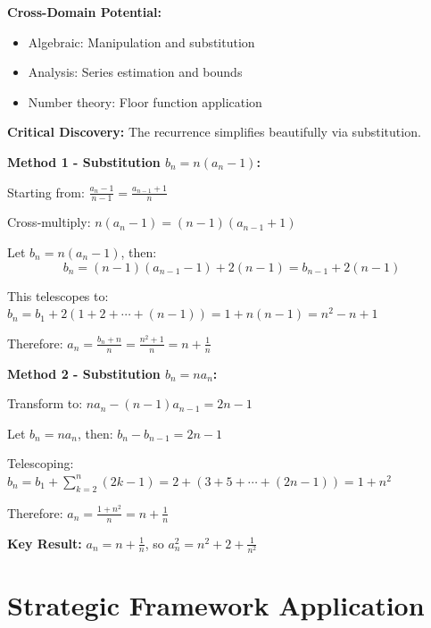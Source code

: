 \documentclass[12pt]{article}
\begin{document}
\begin{problemconfigbox}
\textbf{Cross-Domain Potential:}
\begin{itemize}
    \item Algebraic: Manipulation and substitution
    \item Analysis: Series estimation and bounds
    \item Number theory: Floor function application
\end{itemize}

\end{problemconfigbox}

\begin{keyinsight}
\textbf{Critical Discovery:} The recurrence simplifies beautifully via substitution.

\textbf{Method 1 - Substitution $b_n = n(a_n - 1)$:}

Starting from: $\frac{a_n -1}{n-1}=\frac{a_{n-1}+1}{n}$

Cross-multiply: $n(a_n - 1) = (n-1)(a_{n-1} + 1)$

Let $b_n = n(a_n - 1)$, then:
\[b_n = (n-1)(a_{n-1} - 1) + 2(n-1) = b_{n-1} + 2(n-1)\]

This telescopes to: $b_n = b_1 + 2(1 + 2 + \cdots + (n-1)) = 1 + n(n-1) = n^2 - n + 1$

Therefore: $a_n = \frac{b_n + n}{n} = \frac{n^2 + 1}{n} = n + \frac{1}{n}$

\textbf{Method 2 - Substitution $b_n = na_n$:}

Transform to: $na_n - (n-1)a_{n-1} = 2n - 1$

Let $b_n = na_n$, then: $b_n - b_{n-1} = 2n - 1$

Telescoping: $b_n = b_1 + \sum_{k=2}^{n}(2k-1) = 2 + (3 + 5 + \cdots + (2n-1)) = 1 + n^2$

Therefore: $a_n = \frac{1 + n^2}{n} = n + \frac{1}{n}$

\textbf{Key Result:} $a_n = n + \frac{1}{n}$, so $a_n^2 = n^2 + 2 + \frac{1}{n^2}$
\end{keyinsight}

\section{Strategic Framework Application}
\end{document}
